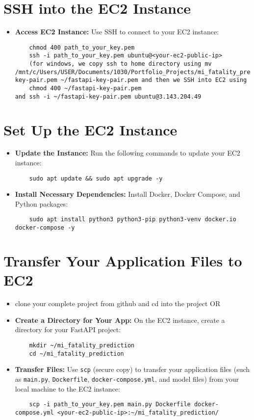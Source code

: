 \documentclass{article}
\begin{document}
\section{SSH into the EC2 Instance}
\begin{itemize}
    \item \textbf{Access EC2 Instance:} Use SSH to connect to your EC2 instance:
    \begin{verbatim}
    chmod 400 path_to_your_key.pem
    ssh -i path_to_your_key.pem ubuntu@<your-ec2-public-ip>
    (for windows, we copy ssh to home directory using mv /mnt/c/Users/USER/Documents/1030/Portfolio_Projects/mi_fatality_prediction/fastapi-key-pair.pem ~/fastapi-key-pair.pem and then we SSH into EC2 using
    chmod 400 ~/fastapi-key-pair.pem
and ssh -i ~/fastapi-key-pair.pem ubuntu@3.143.204.49
    \end{verbatim}
\end{itemize}

\section{Set Up the EC2 Instance}
\begin{itemize}
    \item \textbf{Update the Instance:} Run the following commands to update your EC2 instance:
    \begin{verbatim}
    sudo apt update && sudo apt upgrade -y
    \end{verbatim}
    \item \textbf{Install Necessary Dependencies:} Install Docker, Docker Compose, and Python packages:
    \begin{verbatim}
    sudo apt install python3 python3-pip python3-venv docker.io docker-compose -y
    \end{verbatim}
\end{itemize}

\section{Transfer Your Application Files to EC2}
\begin{itemize}
	\item clone your complete project from github and cd into the project OR
    \item \textbf{Create a Directory for Your App:} On the EC2 instance, create a directory for your FastAPI project:
    \begin{verbatim}
    mkdir ~/mi_fatality_prediction
    cd ~/mi_fatality_prediction
    \end{verbatim}
    \item \textbf{Transfer Files:} Use \texttt{scp} (secure copy) to transfer your application files (such as \texttt{main.py}, \texttt{Dockerfile}, \texttt{docker-compose.yml}, and model files) from your local machine to the EC2 instance:
    \begin{verbatim}
    scp -i path_to_your_key.pem main.py Dockerfile docker-compose.yml <your-ec2-public-ip>:~/mi_fatality_prediction/
    \end{verbatim}
\end{itemize}
\end{document}
